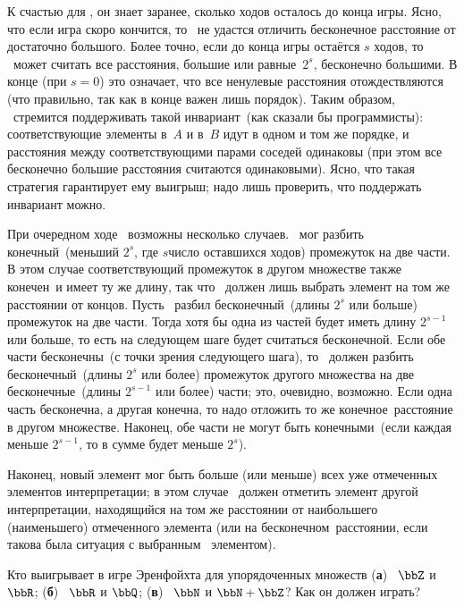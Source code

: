 \begin{itemize}
К счастью для \К, он знает заранее, сколько ходов осталось до
конца игры. Ясно, что если игра скоро кончится, то \Н\ не
удастся отличить бесконечное расстояние от достаточно большого.
Более точно, если до конца игры остаётся $s$ ходов, то \К\ может
считать все расстояния, большие или равные~$2^s$, бесконечно
большими. В конце (при $s=0$) это означает, что все ненулевые
расстояния отождествляются (что правильно, так как в конце важен
лишь порядок). Таким образом, \К\ стремится поддерживать такой
 инвариант\ (как сказали бы программисты): соответствующие
элементы в~$A$ и в~$B$ идут в одном и том же порядке, и
расстояния между соответствующими парами соседей одинаковы (при
этом все бесконечно большие расстояния считаются одинаковыми).
Ясно, что такая стратегия гарантирует ему выигрыш; надо лишь
проверить, что поддержать инвариант можно.

При очередном ходе \Н\ возможны несколько случаев. \Н\ мог
разбить  конечный\ (меньший $2^s$, где $s$\т число
оставшихся ходов) промежуток на две части. В этом случае
соответствующий промежуток в другом множестве также 
конечен\ и имеет ту же длину, так что \К\ должен лишь выбрать
элемент на том же расстоянии от концов. Пусть \Н\ разбил 
бесконечный\ (длины $2^s$ или больше) промежуток на две
части. Тогда хотя бы одна из частей будет иметь длину $2^{s-1}$
или больше, то есть на следующем шаге будет считаться 
бесконечной. Если обе части  бесконечны\ (с точки
зрения следующего шага), то \К\ должен разбить 
бесконечный\ (длины $2^s$ или более) промежуток другого
множества на две  бесконечные\ (длины $2^{s-1}$ или более)
части; это, очевидно, возможно. Если одна часть 
бесконечна, а другая  конечна, то надо отложить то же
 конечное\ расстояние в другом множестве. Наконец, обе
части не могут быть  конечными\ (если каждая меньше
$2^{s-1}$, то в сумме будет меньше $2^s$).

Наконец, новый элемент мог быть больше (или меньше) всех уже
отмеченных элементов интерпретации; в этом случае \К\ должен
отметить элемент другой интерпретации, находящийся на том же
расстоянии от наибольшего (наименьшего) отмеченного элемента
(или на  бесконечном\ расстоянии, если такова была
ситуация с выбранным \Н\ элементом).
\end{itemize}
\medskip

\begin{problem}
Кто выигрывает в игре Эренфойхта для
упорядоченных множеств
        (\textbf{а})~%
$\bbZ$ и $\bbR$;
        (\textbf{б})~%
$\bbR$ и $\bbQ$;
        (\textbf{в})~%
$\bbN$ и $\bbN+\bbZ$?
Как он должен играть?
\end{problem}

